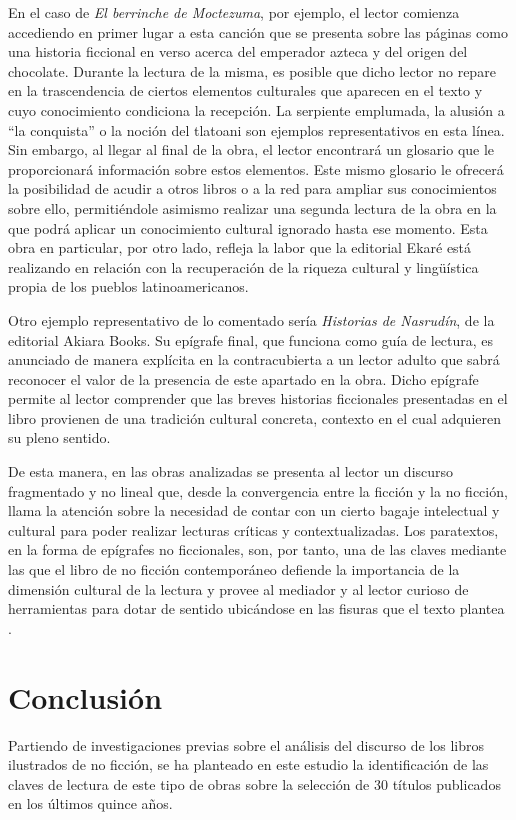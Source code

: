 \documentclass[spanish]{textolivre}
\begin{document}
En el caso de \textit{El berrinche de Moctezuma}, por ejemplo, el lector comienza accediendo en primer lugar a esta canción que se presenta sobre las páginas como una historia ficcional en verso acerca del emperador azteca y del origen del chocolate. Durante la lectura de la misma, es posible que dicho lector no repare en la trascendencia de ciertos elementos culturales que aparecen en el texto y cuyo conocimiento condiciona la recepción. La serpiente emplumada, la alusión a “la conquista” o la noción del tlatoani son ejemplos representativos en esta línea. Sin embargo, al llegar al final de la obra, el lector encontrará un glosario que le proporcionará información sobre estos elementos. Este mismo glosario le ofrecerá la posibilidad de acudir a otros libros o a la red para ampliar sus conocimientos sobre ello, permitiéndole asimismo realizar una segunda lectura de la obra en la que podrá aplicar un conocimiento cultural ignorado hasta ese momento. Esta obra en particular, por otro lado, refleja la labor que la editorial Ekaré está realizando en relación con la recuperación de la riqueza cultural y lingüística propia de los pueblos latinoamericanos.

Otro ejemplo representativo de lo comentado sería \textit{Historias de Nasrudín}, de la editorial Akiara Books. Su epígrafe final, que funciona como guía de lectura, es anunciado de manera explícita en la contracubierta a un lector adulto que sabrá reconocer el valor de la presencia de este apartado en la obra. Dicho epígrafe permite al lector comprender que las breves historias ficcionales presentadas en el libro provienen de una tradición cultural concreta, contexto en el cual adquieren su pleno sentido.

De esta manera, en las obras analizadas se presenta al lector un discurso fragmentado y no lineal que, desde la convergencia entre la ficción y la no ficción, llama la atención sobre la necesidad de contar con un cierto bagaje intelectual y cultural \cite{wolf_lector_2020} para poder realizar lecturas críticas y contextualizadas. Los paratextos, en la forma de epígrafes no ficcionales, son, por tanto, una de las claves mediante las que el libro de no ficción contemporáneo defiende la importancia de la dimensión cultural de la lectura y provee al mediador y al lector curioso de herramientas para dotar de sentido ubicándose en las fisuras que el texto plantea \cite{sanders_literature_2017}.

\section{Conclusión}\label{sec-organizacao}
Partiendo de investigaciones previas sobre el análisis del discurso de los libros ilustrados de no ficción\cite{grilli_non-fiction_2020a,pappas_information_2006,sanders_literature_2017,tabernero__2022,von-merveldt_informational_2018}, se ha planteado en este estudio la identificación de las claves de lectura de este tipo de obras sobre la selección de 30 títulos publicados en los últimos quince años.
\end{document}
